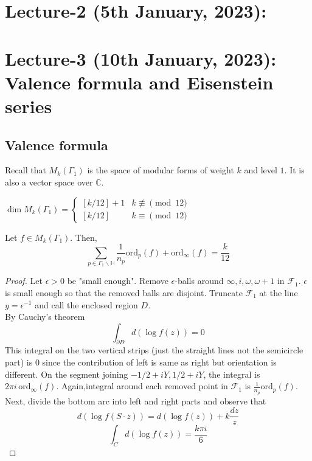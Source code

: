 \documentclass[oneside, 12pt, ]{scrbook}
\newcommand{\CC}{\mathbb C}
\theoremstyle{theorem}
\begin{document}
\chapter{Lecture-2 (5th January, 2023): }

\chapter{Lecture-3 (10th January, 2023): Valence formula and Eisenstein series}

\section{Valence formula}

Recall that $M_{k}(\Gamma_{1})$ is the space of modular forms of weight $k$ and level $1$. It is also a vector space over $\CC$. 

\begin{theorem}
$\dim M_{k}(\Gamma_{1}) = \begin{cases}[k/12]+1 & k\not \equiv \pmod{12} \\ [k/12] & k \equiv \pmod{12} \end{cases}$
\end{theorem}

\begin{proposition}
Let $f \in M_{k}(\Gamma_{1})$. Then, $$\sum_{p \in \Gamma_{1}\backslash \mathbb{H}}\frac{1}{n_{p}} \mathrm{ord}_{p}(f) + \mathrm{ord}_{\infty}(f) = \frac{k}{12}$$
\end{proposition}

\begin{proof}
Let $\epsilon >0$ be "small enough". Remove $\epsilon$-balls around $\infty , i , \omega , \omega + 1$ in $\mathcal{F}_{1}$. $\epsilon$ is small enough so that the removed balls are disjoint. Truncate $\mathcal{F}_{1}$ at the line $y = \epsilon^{-1}$ and call the enclosed region $D$. \\
By Cauchy's theorem $$\int_{\partial D} d(\log f(z)) = 0$$ This integral on the two vertical strips (just the straight lines not the semicircle part) is $0$ since the contribution of left is same as right but orientation is different. On the segment joining $-1/2 + iY , 1/2 + iY$, the integral is $2 \pi i \,\mathrm{ord}_{\infty}(f)$. Again,integral around each removed point in $\mathcal{F}_{1}$ is $\frac{1}{n_{p}} \mathrm{ord}_{p}(f)$. Next, divide the bottom arc into left and right parts and observe that $$d(\log f(S\cdot z)) = d(\log f(z)) + k \frac{dz}{z}$$ $$\int_{C} d(\log f(z)) = \frac{k \pi i }{6}$$ 
\end{proof}
\end{document}
